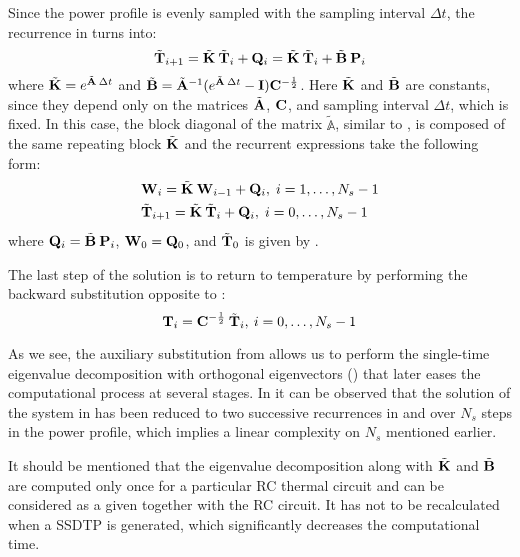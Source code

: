 Since the power profile is evenly sampled with the sampling interval $\Delta t$, the recurrence in  turns into:
\[
  \tilde{\mathbf{T}}_{i+1} = \tilde{\mathbf{K}} \: \tilde{\mathbf{T}}_i + \mathbf{Q}_i = \tilde{\mathbf{K}} \: \tilde{\mathbf{T}}_i + \tilde{\mathbf{B}} \: \mathbf{P}_i
\]
where $\tilde{\mathbf{K}} = e^{\tilde{\mathbf{A}} \: \Delta t}$ and $\tilde{\mathbf{B}} = \tilde{\mathbf{A}}^{-1} ( e^{\tilde{\mathbf{A}} \: \Delta t} - \mathbf{I} ) \mathbf{C}^{-\frac{1}{2}}$. Here $\tilde{\mathbf{K}}$ and $\tilde{\mathbf{B}}$ are constants, since they depend only on the matrices $\tilde{\mathbf{A}}$, $\mathbf{C}$, and sampling interval $\Delta t$, which is fixed. In this case, the block diagonal of the matrix $\tilde{\mathbb{A}}$, similar to , is composed of the same repeating block $\tilde{\mathbf{K}}$ and the recurrent expressions take the following form:
\begin{align}
  & \mathbf{W}_i = \tilde{\mathbf{K}} \: \mathbf{W}_{i - 1} + \mathbf{Q}_i, \; i = 1, \dots, N_s - 1 \label{eq:final-p-recurrence} \\
  & \tilde{\mathbf{T}}_{i + 1} = \tilde{\mathbf{K}} \: \tilde{\mathbf{T}}_i + \mathbf{Q}_i, \; i = 0, \dots, N_s - 1 \label{eq:final-y-recurrence}
\end{align}
where $\mathbf{Q}_i = \tilde{\mathbf{B}} \: \mathbf{P}_i$, $\mathbf{W}_0 = \mathbf{Q}_0$, and $\tilde{\mathbf{T}}_0$ is given by .

The last step of the solution is to return to temperature by performing the backward substitution opposite to :
\[
  \mathbf{T}_i = \mathbf{C}^{-\frac{1}{2}} \: \tilde{\mathbf{T}}_i, \: i = 0, \dots, N_s - 1
\]

As we see, the auxiliary substitution from  allows us to perform the single-time eigenvalue decomposition with orthogonal eigenvectors () that later eases the computational process at several stages. In  it can be observed that the solution of the system in  has been reduced to two successive recurrences in  and  over $N_s$ steps in the power profile, which implies a linear complexity on $N_s$ mentioned earlier.

It should be mentioned that the eigenvalue decomposition along with $\tilde{\mathbf{K}}$ and $\tilde{\mathbf{B}}$ are computed only once for a particular RC thermal circuit and can be considered as a given together with the RC circuit. It has not to be recalculated when a SSDTP is generated, which significantly decreases the computational time.
